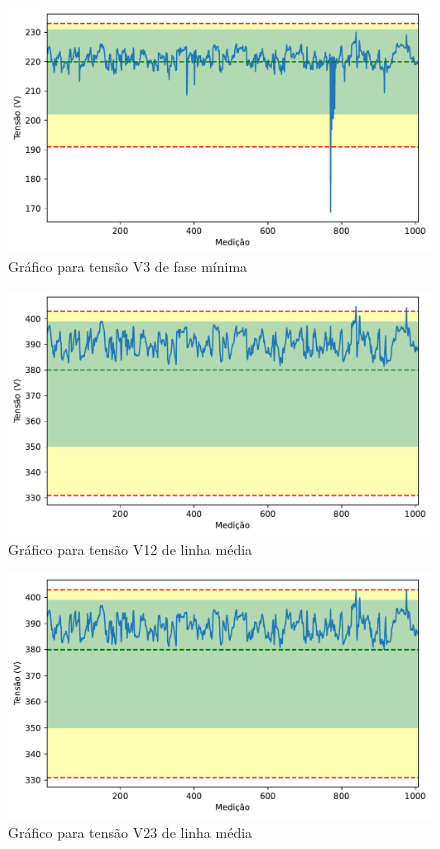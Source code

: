 \begin{figure}[H]
	\centering
	\caption{Gráfico para tensão V3 de fase mínima}
    \includegraphics[width=16cm]{illustrations/figures/a2_V3_Min.pdf}
\end{figure}

\begin{figure}[H]
	\centering
	\caption{Gráfico para tensão V12 de linha média}
    \includegraphics[width=16cm]{illustrations/figures/a2_V12_Avg.pdf}
\end{figure}

\begin{figure}[H]
	\centering
	\caption{Gráfico para tensão V23 de linha média}
    \includegraphics[width=16cm]{illustrations/figures/a2_V23_Avg.pdf}
\end{figure}

